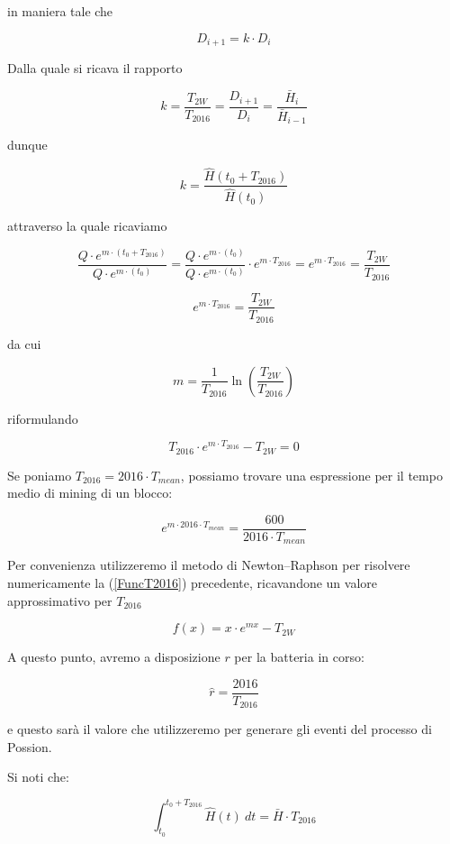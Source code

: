 \documentclass{book}
\theoremstyle{definition}
\begin{document}
in maniera tale che

$$
    D_{i+1} = k \cdot D_{i}
$$

Dalla quale si ricava il rapporto

$$
    k = \frac{T_{2W}}{T_{2016}} = \frac{D_{i+1}}{D_{i}} = \frac{\bar{H}_{i}}{\bar{H}_{i-1}}
$$ 

dunque

$$
    k = \frac{\hat{H}(t_{0} + T_{2016})}{\hat{H}(t_{0})}
$$

attraverso la quale ricaviamo

$$
\frac{Q \cdot e^{m \cdot (t_{0} + T_{2016})}}{Q \cdot e^{m \cdot (t_{0})}} = \frac{ Q \cdot e^{m \cdot (t_{0})} }{ Q \cdot e^{m \cdot (t_{0})} } \cdot e^{m \cdot T_{2016}} = e^{m \cdot T_{2016}} = \frac{T_{2W}}{T_{2016}} 
$$

$$
    e^{m \cdot T_{2016}} = \frac{T_{2W}}{T_{2016}}
$$

da cui

$$
m = \frac{1}{T_{2016}} \ln(\frac{T_{2W}}{T_{2016}})
$$

riformulando

\begin{equation}
    T_{2016} \cdot e^{m \cdot T_{2016}} - T_{2W} = 0 \label{FuncT2016}
\end{equation}

Se poniamo $T_{2016} = 2016 \cdot T_{mean}$, possiamo trovare una espressione per il tempo medio di mining di un blocco:

$$
    e^{m \cdot 2016 \cdot T_{mean}} = \frac{600}{2016 \cdot T_{mean}}
$$

Per convenienza utilizzeremo il metodo di Newton–Raphson per risolvere numericamente la (\ref{FuncT2016}) precedente, ricavandone un valore approssimativo per $T_{2016}$

\begin{equation}
    f(x) = x \cdot e^{mx} - T_{2W}
\end{equation}

A questo punto, avremo a disposizione $r$ per la batteria in corso:

$$
    \hat{r} = \frac{2016}{T_{2016}}
$$

e questo sarà il valore che utilizzeremo per generare gli eventi del processo di Possion.

Si noti che:

\begin{equation}
    \int_{t_{0}}^{ t_{0} + T_{2016} } \hat{H}(t) \ dt = \bar{H} \cdot T_{2016}
\end{equation}
\end{document}
